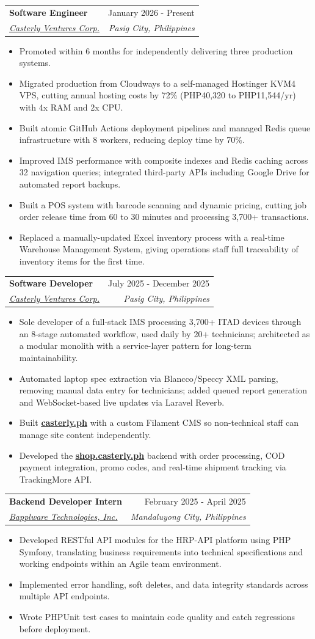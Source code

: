 \documentclass[a4paper,12pt]{article}
\makeatletter
\newcommand{\resumeItem}[1]{
  \item\small{
    {#1 \vspace{-2pt}}
  }
}
\newcommand{\resumeSubheading}[4]{
  \vspace{-2pt}\item
    \begin{tabular*}{0.97\textwidth}[t]{l@{\extracolsep{\fill}}r}
      \textbf{#1} & #2 \\
      \textit{\small#3} & \textit{\small #4} \\
    \end{tabular*}\vspace{-7pt}
}
\newcommand{\resumeItemListStart}{\begin{itemize}}
\newcommand{\resumeItemListEnd}{\end{itemize}\vspace{-5pt}}
\makeatother
\begin{document}
    \resumeSubheading
      {Software Engineer}{January 2026 - Present}
      {\href{https://casterly.ph/}{Casterly Ventures Corp.}}{Pasig City, Philippines}
      \resumeItemListStart
        \resumeItem{Promoted within 6 months for independently delivering three production systems.}
        \resumeItem{Migrated production from Cloudways to a self-managed Hostinger KVM4 VPS, cutting annual hosting costs by 72\% (PHP40,320 to PHP11,544/yr) with 4x RAM and 2x CPU.}
        \resumeItem{Built atomic GitHub Actions deployment pipelines and managed Redis queue infrastructure with 8 workers, reducing deploy time by 70\%.}
        \resumeItem{Improved IMS performance with composite indexes and Redis caching across 32 navigation queries; integrated third-party APIs including Google Drive for automated report backups.}
        \resumeItem{Built a POS system with barcode scanning and dynamic pricing, cutting job order release time from 60 to 30 minutes and processing 3,700+ transactions.}
        \resumeItem{Replaced a manually-updated Excel inventory process with a real-time Warehouse Management System, giving operations staff full traceability of inventory items for the first time.}
      \resumeItemListEnd
    
    \resumeSubheading
      {Software Developer}{July 2025 - December 2025}
      {\href{https://casterly.ph/}{Casterly Ventures Corp.}}{Pasig City, Philippines}
      \resumeItemListStart
        \resumeItem{Sole developer of a full-stack IMS processing 3,700+ ITAD devices through an 8-stage automated workflow, used daily by 20+ technicians; architected as a modular monolith with a service-layer pattern for long-term maintainability.}
        \resumeItem{Automated laptop spec extraction via Blancco/Speccy XML parsing, removing manual data entry for technicians; added queued report generation and WebSocket-based live updates via Laravel Reverb.}
        \resumeItem{Built \href{https://casterly.ph}{\textbf{\underline{casterly.ph}}} with a custom Filament CMS so non-technical staff can manage site content independently.}
        \resumeItem{Developed the \href{https://shop.casterly.ph}{\textbf{\underline{shop.casterly.ph}}} backend with order processing, COD payment integration, promo codes, and real-time shipment tracking via TrackingMore API.}
      \resumeItemListEnd
    

    \resumeSubheading
      {Backend Developer Intern}{February 2025 - April 2025}
      {\href{https://bapplware.com/}{Bapplware Technologies, Inc.}}{Mandaluyong City, Philippines}
        \resumeItemListStart
            \resumeItem{Developed RESTful API modules for the HRP-API platform using PHP Symfony, translating business requirements into technical specifications and working endpoints within an Agile team environment.}
            \resumeItem{Implemented error handling, soft deletes, and data integrity standards across multiple API endpoints.}
            \resumeItem{Wrote PHPUnit test cases to maintain code quality and catch regressions before deployment.}
        \resumeItemListEnd
\end{document}
